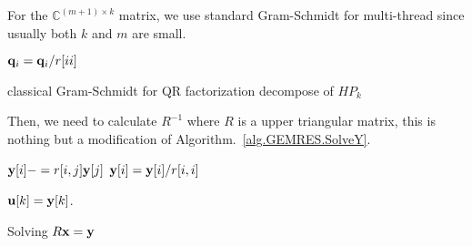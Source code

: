 For the $\mathbb{C}^{(m+1)\times k}$ matrix, we use standard Gram-Schmidt for multi-thread since usually both $k$ and $m$ are small.
\begin{algorithm}[H]
\begin{algorithmic}
    \EndFor
        \EndFor
    \EndIf
\EndFor
{}
    \State ${\bf q}_i={\bf q}_i/r[ii]$
\EndFor

\end{algorithmic}
\caption{classical Gram-Schmidt for QR factorization decompose of $HP_k$}
\end{algorithm}

Then, we need to calculate $R^{-1}$ where $R$ is a upper triangular matrix, this is nothing but a modification of Algorithm.~\ref{alg.GEMRES.SolveY}.
\begin{algorithm}[H]
\begin{algorithmic}
        \State ${\bf y}[i]-=r[i,j] {\bf y}[j]$
    \EndFor
    \State ${\bf y}[i] = {\bf y}[i] / r[i,i]$
\EndFor

\Return ${\bf u}[k]={\bf y}[k]$.
\end{algorithmic}
\caption{Solving $R{\bf x}={\bf y}$}
\end{algorithm}
